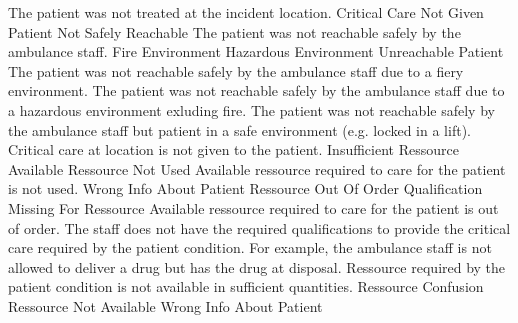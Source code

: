 \stopkaosspec
\startkaosspec
	 {The patient was not treated at the incident location.}
	 {Critical Care Not Given}
	 {Patient Not Safely Reachable}
\stopkaosspec
\startkaosspec
	 {The patient was not reachable safely by the ambulance staff.}
	 {Fire Environment}
	 {Hazardous Environment}
	 {Unreachable Patient}
\stopkaosspec
\startkaosspec
	 {The patient was not reachable safely by the ambulance staff due to a fiery environment.}
\stopkaosspec
\startkaosspec
	 {The patient was not reachable safely by the ambulance staff due to a hazardous environment exluding fire.}
\stopkaosspec
\startkaosspec
	 {The patient was not reachable safely by the ambulance staff but patient in a safe environment (e.g. locked in a lift).}
\stopkaosspec
\startkaosspec
	 {Critical care at location is not given to the patient.}
	 {Insufficient Ressource}
	 {Available Ressource Not Used}
\stopkaosspec
\startkaosspec
	 {Available ressource required to care for the patient is not used.}
	 {Wrong Info About Patient}
	 {Ressource Out Of Order}
	 {Qualification Missing For Ressource}
\stopkaosspec
\startkaosspec
	 {Available ressource required to care for the patient is out of order.}
\stopkaosspec
\startkaosspec
	 {The staff does not have the required qualifications to provide the critical care required by the patient condition. For example, the ambulance staff is not allowed to deliver a drug but has the drug at disposal.}
\stopkaosspec
\startkaosspec
	 {Ressource required by the patient condition is not available in sufficient quantities.}
	 {Ressource Confusion}
	 {Ressource Not Available}
	 {Wrong Info About Patient}
\stopkaosspec
\startkaosspec
